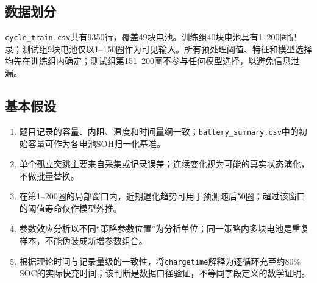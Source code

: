 \documentclass[withoutpreface]{cumcmthesis}
\begin{document}
\subsection{数据划分}

\texttt{cycle\_train.csv}共有9350行，覆盖49块电池。训练组40块电池具有1--200圈记录；测试组9块电池仅以1--150圈作为可见输入。所有预处理阈值、特征和模型选择均先在训练组内确定；测试组第151--200圈不参与任何模型选择，以避免信息泄漏。

\subsection{基本假设}

\begin{enumerate}[label=H\arabic*：]
  \item 题目记录的容量、内阻、温度和时间量纲一致；\texttt{battery\_summary.csv}中的初始容量可作为各电池SOH归一化基准。
  \item 单个孤立突跳主要来自采集或记录误差；连续变化视为可能的真实状态演化，不做批量替换。
  \item 在第1--200圈的局部窗口内，近期退化趋势可用于预测随后50圈；超过该窗口的阈值寿命仅作模型外推。
  \item 参数效应分析以不同“策略参数位置”为分析单位；同一策略内多块电池是重复样本，不能伪装成新增参数组合。
  \item 根据理论时间与记录量级的一致性，将\texttt{chargetime}解释为逐循环充至约80\% SOC的实际快充时间；该判断是数据口径验证，不等同字段定义的数学证明。
\end{enumerate}
\end{document}
